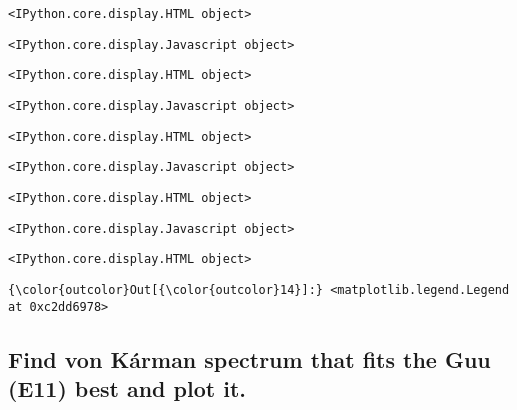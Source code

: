 \documentclass[11pt]{article}
\begin{document}
    
    
    \begin{verbatim}
<IPython.core.display.HTML object>
    \end{verbatim}

    
    
    \begin{verbatim}
<IPython.core.display.Javascript object>
    \end{verbatim}

    
    
    \begin{verbatim}
<IPython.core.display.HTML object>
    \end{verbatim}

    
    
    \begin{verbatim}
<IPython.core.display.Javascript object>
    \end{verbatim}

    
    
    \begin{verbatim}
<IPython.core.display.HTML object>
    \end{verbatim}

    
    
    \begin{verbatim}
<IPython.core.display.Javascript object>
    \end{verbatim}

    
    
    \begin{verbatim}
<IPython.core.display.HTML object>
    \end{verbatim}

    
    
    \begin{verbatim}
<IPython.core.display.Javascript object>
    \end{verbatim}

    
    
    \begin{verbatim}
<IPython.core.display.HTML object>
    \end{verbatim}

    
\begin{Verbatim}[commandchars=\\\{\}]
{\color{outcolor}Out[{\color{outcolor}14}]:} <matplotlib.legend.Legend at 0xc2dd6978>
\end{Verbatim}
            
    \subsection{Find von Kárman spectrum that fits the Guu (E11) best and
plot
it.}\label{find-von-kuxe1rman-spectrum-that-fits-the-guu-e11-best-and-plot-it.}
\end{document}
